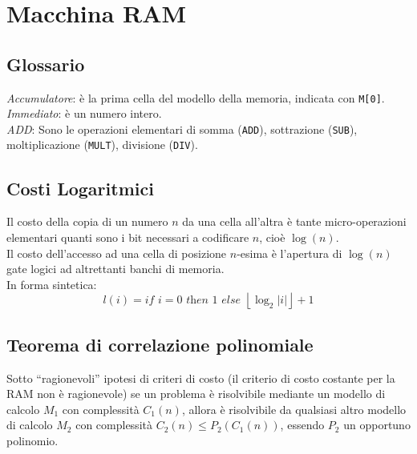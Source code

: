 \documentclass[10pt,a4paper]{article}
\newcommand{\code}{\texttt}
\begin{document}
\section*{Macchina RAM}
\begin{multicols}{2}
\subsection*{Glossario}

\textit{Accumulatore}: \`e la prima cella del modello della memoria, indicata con \code{M[0]}.\\
\textit{Immediato}: \`e un numero intero.\\
\textit{ADD}: Sono le operazioni elementari di somma (\code{ADD}), sottrazione (\code{SUB}), moltiplicazione (\code{MULT}), divisione (\code{DIV}).

\subsection*{Costi Logaritmici}
Il costo della copia di un numero $n$ da una cella all'altra \`e tante micro-operazioni elementari quanti sono i bit necessari a codificare $n$, cio\`e $\log(n)$.\\
Il costo dell'accesso ad una cella di posizione $n$-esima \`e l'apertura di $\log(n)$ gate logici ad altrettanti banchi di memoria.\\
In forma sintetica:
\begin{equation*}
    l(i) = \textit{if } i=0 \textit{ then } 1
    \textit{ else } \left\lfloor\log_2|i|\right\rfloor + 1
\end{equation*}

\subsection*{Teorema di correlazione polinomiale}
Sotto ``ragionevoli'' ipotesi di criteri di costo (il criterio di costo costante per la RAM non \`e ragionevole) se un problema \`e risolvibile mediante un modello di calcolo $M_1$ con complessit\`a $C_1(n)$, allora \`e risolvibile da qualsiasi altro modello di calcolo $M_2$ con complessit\`a $C_2(n) \le P_2(C_1(n))$, essendo $P_2$ un opportuno polinomio.
\end{multicols}
\end{document}
